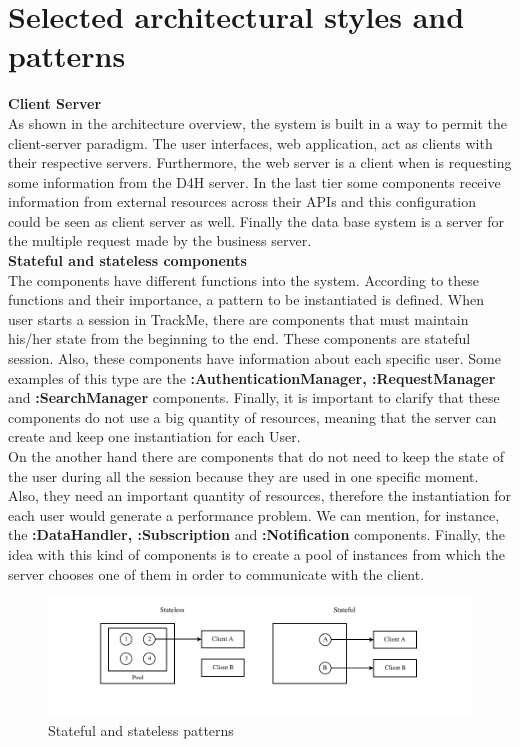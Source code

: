 \documentclass[a4paper, hidelinks, 12pt]{report}
\begin{document}
	\section{Selected architectural styles and patterns}
	\textbf{Client Server}\\
	As shown in the architecture overview, the system is built in a way to permit the client-server paradigm. The user interfaces, web application, act as clients with their respective servers. Furthermore, the web server is a client when is requesting some
information from the D4H server. In the last tier some components receive information from external resources across their APIs and this configuration could be seen as client server as well. Finally the data base system is a server for the multiple request made by the business server.\\

\textbf{Stateful and stateless components}\\
The components have different functions into the system. According to these functions and their importance, a pattern to be instantiated is defined. When user starts a session in TrackMe, there are components that must maintain his/her state from the beginning to the end. These components are stateful session. Also, these components have information about each specific user. Some examples of this type are the \textbf{:AuthenticationManager, :RequestManager} and \textbf{:SearchManager} components. Finally, it is important to clarify that these components do not use a big quantity of resources, meaning that the server can create and keep one instantiation for each User.\\
On the another hand there are components that do not need to keep the state of the user during all the session because they are used in one specific moment. Also, they need an important quantity of resources, therefore the instantiation for each user
would generate a performance problem. We can mention, for instance, the \textbf{:DataHandler, :Subscription} and \textbf{:Notification} components. Finally, the idea with this kind of components is to create a pool of instances from which the server chooses one of them in order to communicate with the client.

\begin{figure}[H]
		\centering
		\includegraphics[scale=0.65]{diagrams/state_pool.png}
		\caption[Design Pattern: Stateful and stateless patterns]{Stateful and stateless patterns}
		\label{fig:Stateful and stateless patterns}
	\end{figure}
\end{document}
